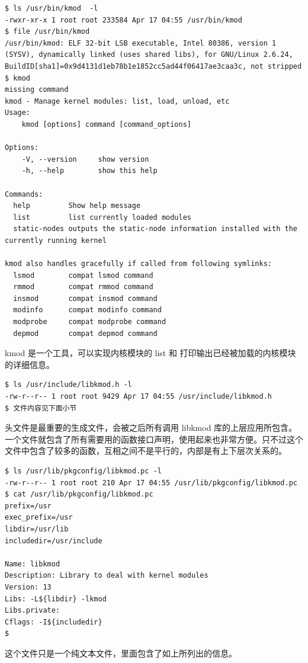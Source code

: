 {\begin{shaded}\begin{verbatim}
$ ls /usr/bin/kmod  -l
-rwxr-xr-x 1 root root 233584 Apr 17 04:55 /usr/bin/kmod
$ file /usr/bin/kmod
/usr/bin/kmod: ELF 32-bit LSB executable, Intel 80386, version 1 (SYSV), dynamically linked (uses shared libs), for GNU/Linux 2.6.24, BuildID[sha1]=0x9d4131d1eb78b1e1852cc5ad44f06417ae3caa3c, not stripped
$ kmod
missing command
kmod - Manage kernel modules: list, load, unload, etc
Usage:
    kmod [options] command [command_options]

Options:
    -V, --version     show version
    -h, --help        show this help

Commands:
  help         Show help message
  list         list currently loaded modules
  static-nodes outputs the static-node information installed with the currently running kernel

kmod also handles gracefully if called from following symlinks:
  lsmod        compat lsmod command
  rmmod        compat rmmod command
  insmod       compat insmod command
  modinfo      compat modinfo command
  modprobe     compat modprobe command
  depmod       compat depmod command
\end{verbatim}\end{shaded}}
kmod 是一个工具，可以实现内核模块的 list 和
打印输出已经被加载的内核模块的详细信息。

{\begin{shaded}\begin{verbatim}
$ ls /usr/include/libkmod.h -l
-rw-r--r-- 1 root root 9429 Apr 17 04:55 /usr/include/libkmod.h
$ 文件内容见下面小节
\end{verbatim}\end{shaded}}
头文件是最重要的生成文件，会被之后所有调用 libkmod
库的上层应用所包含。一个文件就包含了所有需要用的函数接口声明，使用起来也非常方便。只不过这个文件中包含了较多的函数，互相之间不是平行的，内部是有上下层次关系的。

{\begin{shaded}\begin{verbatim}
$ ls /usr/lib/pkgconfig/libkmod.pc -l
-rw-r--r-- 1 root root 210 Apr 17 04:55 /usr/lib/pkgconfig/libkmod.pc
$ cat /usr/lib/pkgconfig/libkmod.pc 
prefix=/usr
exec_prefix=/usr
libdir=/usr/lib
includedir=/usr/include

Name: libkmod
Description: Library to deal with kernel modules
Version: 13
Libs: -L${libdir} -lkmod
Libs.private:  
Cflags: -I${includedir}
$ 
\end{verbatim}\end{shaded}}
这个文件只是一个纯文本文件，里面包含了如上所列出的信息。


